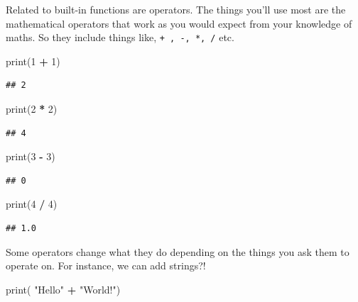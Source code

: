 \documentclass[]{book}
\newenvironment{Shaded}{\begin{snugshade}}{\end{snugshade}}
\newcommand{\BuiltInTok}[1]{#1}
\newcommand{\DecValTok}[1]{\textcolor[rgb]{0.00,0.00,0.81}{#1}}
\newcommand{\NormalTok}[1]{#1}
\newcommand{\OperatorTok}[1]{\textcolor[rgb]{0.81,0.36,0.00}{\textbf{#1}}}
\newcommand{\StringTok}[1]{\textcolor[rgb]{0.31,0.60,0.02}{#1}}
\theoremstyle{definition}
\theoremstyle{definition}
\theoremstyle{definition}
\theoremstyle{remark}
\begin{document}
Related to built-in functions are operators. The things you'll use most
are the mathematical operators that work as you would expect from your
knowledge of maths. So they include things like,
\texttt{+\ ,\ -,\ *,\ /} etc.

\begin{Shaded}
\begin{Highlighting}[]
\BuiltInTok{print}\NormalTok{(}\DecValTok{1} \OperatorTok{+} \DecValTok{1}\NormalTok{)}
\end{Highlighting}
\end{Shaded}

\begin{verbatim}
## 2
\end{verbatim}

\begin{Shaded}
\begin{Highlighting}[]
\BuiltInTok{print}\NormalTok{(}\DecValTok{2} \OperatorTok{*} \DecValTok{2}\NormalTok{)}
\end{Highlighting}
\end{Shaded}

\begin{verbatim}
## 4
\end{verbatim}

\begin{Shaded}
\begin{Highlighting}[]
\BuiltInTok{print}\NormalTok{(}\DecValTok{3} \OperatorTok{-} \DecValTok{3}\NormalTok{)}
\end{Highlighting}
\end{Shaded}

\begin{verbatim}
## 0
\end{verbatim}

\begin{Shaded}
\begin{Highlighting}[]
\BuiltInTok{print}\NormalTok{(}\DecValTok{4} \OperatorTok{/} \DecValTok{4}\NormalTok{)}
\end{Highlighting}
\end{Shaded}

\begin{verbatim}
## 1.0
\end{verbatim}

Some operators change what they do depending on the things you ask them
to operate on. For instance, we can add strings?!

\begin{Shaded}
\begin{Highlighting}[]
\BuiltInTok{print}\NormalTok{( }\StringTok{"Hello"} \OperatorTok{+} \StringTok{"World!"}\NormalTok{)}
\end{Highlighting}
\end{Shaded}
\end{document}
